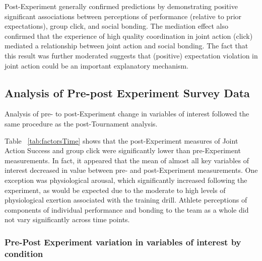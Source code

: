 

Post-Experiment generally confirmed predictions by demonstrating positive significant associations between perceptions of performance (relative to prior expectations), group click, and social bonding.  The mediation effect also confirmed that the experience of high quality coordination in joint action (click) mediated a relationship between joint action and social bonding.  The fact that this result was further moderated suggests that (positive) expectation violation in joint action could be an important explanatory mechanism.











\subsection{Analysis of Pre-post Experiment Survey Data}

Analysis of pre- to post-Experiment change in variables of interest followed the same procedure as the post-Tournament analysis.


  \begin{landscape}
    \centering
      
   \end{landscape}
\restoregeometry

Table ~\ref{tab:factorsTime} shows that the post-Experiment measures of Joint Action Success and group click were significantly lower than pre-Experiment measurements.  In fact, it appeared that the mean of almost all key variables of interest decreased in value between pre- and post-Experiment measurements. One exception was physiological arousal, which significantly increased following the experiment, as would be expected due to the moderate to high levels of physiological exertion associated with the training drill.  Athlete perceptions of components of individual performance and bonding to the team as a whole did not vary significantly across time points.



\subsubsection{Pre-Post Experiment variation in variables of interest by condition}

